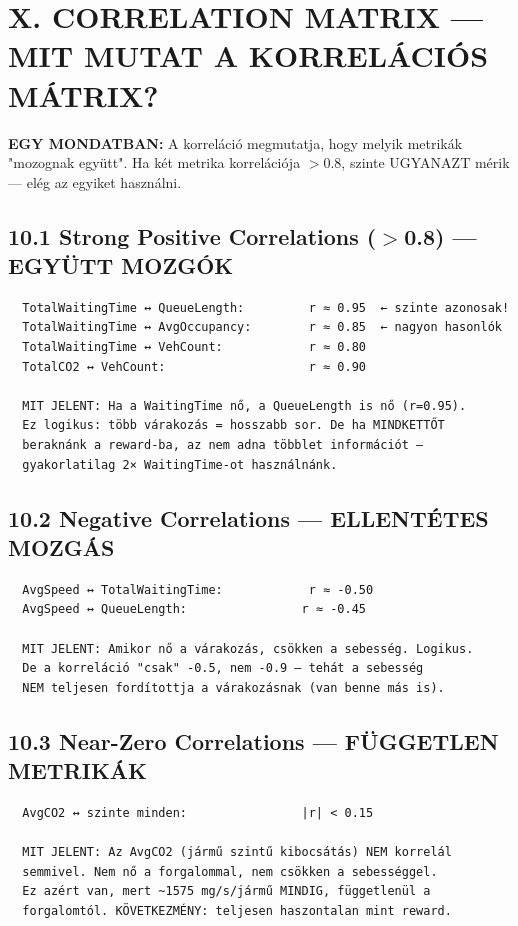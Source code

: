 \documentclass[11pt,a4paper]{article}
\begin{document}
\section*{X. CORRELATION MATRIX — MIT MUTAT A KORRELÁCIÓS MÁTRIX?}

\textbf{EGY MONDATBAN:}
A korreláció megmutatja, hogy melyik metrikák "mozognak együtt".
Ha két metrika korrelációja $>$0.8, szinte UGYANAZT mérik — elég
az egyiket használni.

\subsection*{10.1 Strong Positive Correlations ($>$0.8) — EGYÜTT MOZGÓK}
\vspace{1em}\begin{verbatim}
  TotalWaitingTime ↔ QueueLength:         r ≈ 0.95  ← szinte azonosak!
  TotalWaitingTime ↔ AvgOccupancy:        r ≈ 0.85  ← nagyon hasonlók
  TotalWaitingTime ↔ VehCount:            r ≈ 0.80
  TotalCO2 ↔ VehCount:                    r ≈ 0.90

  MIT JELENT: Ha a WaitingTime nő, a QueueLength is nő (r=0.95).
  Ez logikus: több várakozás = hosszabb sor. De ha MINDKETTŐT
  beraknánk a reward-ba, az nem adna többlet információt —
  gyakorlatilag 2× WaitingTime-ot használnánk.

\end{verbatim}
\subsection*{10.2 Negative Correlations — ELLENTÉTES MOZGÁS}
\vspace{1em}\begin{verbatim}
  AvgSpeed ↔ TotalWaitingTime:            r ≈ -0.50
  AvgSpeed ↔ QueueLength:                r ≈ -0.45

  MIT JELENT: Amikor nő a várakozás, csökken a sebesség. Logikus.
  De a korreláció "csak" -0.5, nem -0.9 — tehát a sebesség
  NEM teljesen fordítottja a várakozásnak (van benne más is).

\end{verbatim}
\subsection*{10.3 Near-Zero Correlations — FÜGGETLEN METRIKÁK}
\vspace{1em}\begin{verbatim}
  AvgCO2 ↔ szinte minden:                |r| < 0.15

  MIT JELENT: Az AvgCO2 (jármű szintű kibocsátás) NEM korrelál
  semmivel. Nem nő a forgalommal, nem csökken a sebességgel.
  Ez azért van, mert ~1575 mg/s/jármű MINDIG, függetlenül a
  forgalomtól. KÖVETKEZMÉNY: teljesen haszontalan mint reward.

\end{verbatim}
\end{document}
